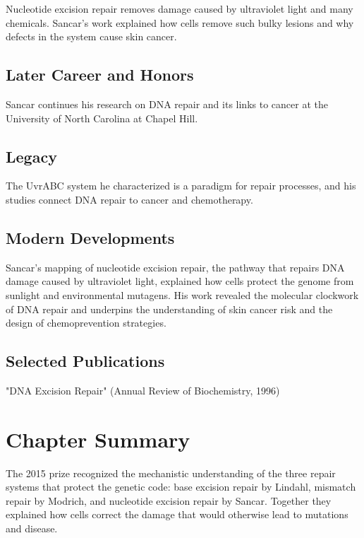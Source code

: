 Nucleotide excision repair removes damage caused by ultraviolet light and many chemicals. Sancar's work explained how cells remove such bulky lesions and why defects in the system cause skin cancer.

\subsection*{Later Career and Honors}

Sancar continues his research on DNA repair and its links to cancer at the University of North Carolina at Chapel Hill.

\subsection*{Legacy}

The UvrABC system he characterized is a paradigm for repair processes, and his studies connect DNA repair to cancer and chemotherapy.

\subsection*{Modern Developments}

Sancar's mapping of nucleotide excision repair, the pathway that repairs DNA damage caused by ultraviolet light, explained how cells protect the genome from sunlight and environmental mutagens. His work revealed the molecular clockwork of DNA repair and underpins the understanding of skin cancer risk and the design of chemoprevention strategies.

\subsection*{Selected Publications}

"DNA Excision Repair" (Annual Review of Biochemistry, 1996)

\clearpage

\section*{Chapter Summary}

The 2015 prize recognized the mechanistic understanding of the three repair systems that protect the genetic code: base excision repair by Lindahl, mismatch repair by Modrich, and nucleotide excision repair by Sancar. Together they explained how cells correct the damage that would otherwise lead to mutations and disease.
